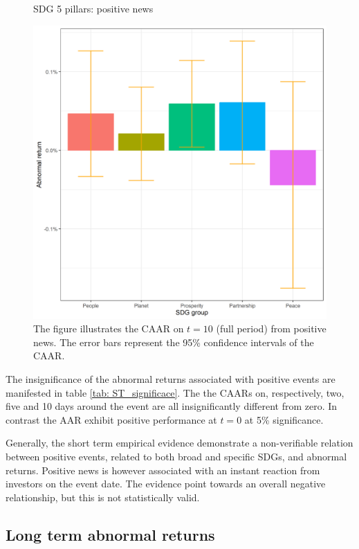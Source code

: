 \begin{figure} [H]
    \centering
    \caption{SDG 5 pillars: positive news}
    \includegraphics[scale=0.6]{Projekt/1.Figures analysis/ST_positive_sdg_bar_groups_0.png}
    \caption*{\footnotesize The figure illustrates the CAAR on $t = 10$ (full period) from positive news. The error bars represent the 95\% confidence intervals of the CAAR.}
    \label{fig:ST_pos_bar}
\end{figure}

The insignificance of the abnormal returns associated with positive events are manifested in table \ref{tab: ST_significace}. The the CAARs on, respectively, two, five and 10 days around the event are all insignificantly different from zero. In contrast the AAR exhibit positive performance at $t = 0$ at 5\% significance. 

Generally, the short term empirical evidence demonstrate a non-verifiable relation between positive events, related to both broad and specific SDGs, and abnormal returns. Positive news is however associated with an instant reaction from investors on the event date. The evidence point towards an overall negative relationship, but this is not statistically valid.  


\subsection{Long term abnormal returns}

